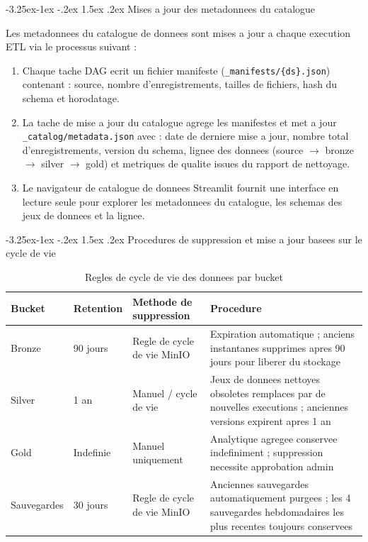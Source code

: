 \documentclass[a4paper,11pt,oneside,openany]{report}
\makeatletter
\renewcommand\subsection{\@startsection{subsection}{2}{\z@}%
  {-3.25ex\@plus -1ex \@minus -.2ex}%
  {1.5ex \@plus .2ex}%
  {\normalfont\large\bfseries\color{ntdarkgreen}}}
\makeatother
\begin{document}
\subsection{Mises a jour des metadonnees du catalogue}

Les metadonnees du catalogue de donnees sont mises a jour a chaque execution
ETL via le processus suivant :
\begin{enumerate}[nosep]
  \item Chaque tache DAG ecrit un fichier manifeste (\texttt{\_manifests/\{ds\}.json})
        contenant : source, nombre d'enregistrements, tailles de fichiers, hash du
        schema et horodatage.
  \item La tache de mise a jour du catalogue agrege les manifestes et met a jour
        \texttt{\_catalog/metadata.json} avec : date de derniere mise a jour, nombre
        total d'enregistrements, version du schema, lignee des donnees
        (source $\to$ bronze $\to$ silver $\to$ gold) et metriques de qualite issues
        du rapport de nettoyage.
  \item Le navigateur de catalogue de donnees Streamlit fournit une interface en
        lecture seule pour explorer les metadonnees du catalogue, les schemas des
        jeux de donnees et la lignee.
\end{enumerate}

\subsection{Procedures de suppression et mise a jour basees sur le cycle de vie}

\begin{table}[H]
\centering
\caption{Regles de cycle de vie des donnees par bucket}
\label{tab:lifecycle}
\begin{tabularx}{\textwidth}{L{2cm} L{2cm} L{3cm} L{5.5cm}}
\toprule
\textbf{Bucket} & \textbf{Retention} & \textbf{Methode de suppression} & \textbf{Procedure} \\
\midrule
Bronze & 90 jours & Regle de cycle de vie MinIO & Expiration automatique ; anciens instantanes supprimes apres 90 jours pour liberer du stockage \\
Silver & 1 an & Manuel / cycle de vie & Jeux de donnees nettoyes obsoletes remplaces par de nouvelles executions ; anciennes versions expirent apres 1 an \\
Gold & Indefinie & Manuel uniquement & Analytique agregee conservee indefiniment ; suppression necessite approbation admin \\
Sauvegardes & 30 jours & Regle de cycle de vie MinIO & Anciennes sauvegardes automatiquement purgees ; les 4 sauvegardes hebdomadaires les plus recentes toujours conservees \\
\bottomrule
\end{tabularx}
\end{table}
\end{document}
